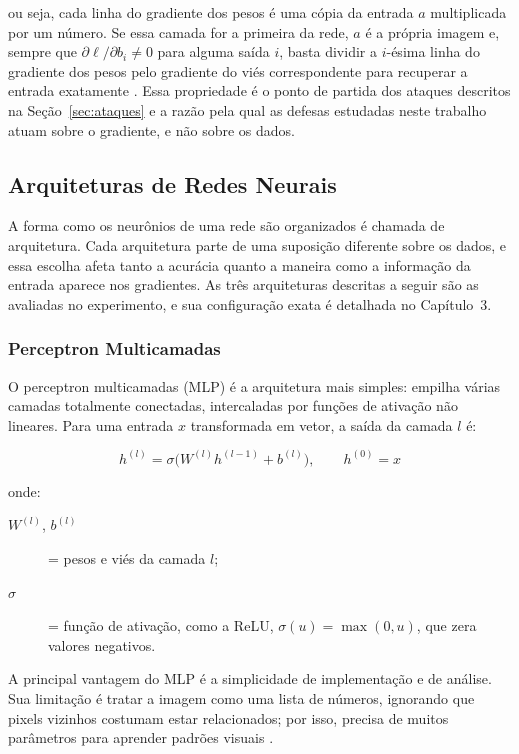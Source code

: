 \noindent ou seja, cada linha do gradiente dos pesos é uma cópia da entrada $a$ multiplicada por um número. Se essa camada for a primeira da rede, $a$ é a própria imagem e, sempre que $\partial \ell / \partial b_i \neq 0$ para alguma saída $i$, basta dividir a $i$-ésima linha do gradiente dos pesos pelo gradiente do viés correspondente para recuperar a entrada exatamente \cite{Geiping2020,Phong2018}. Essa propriedade é o ponto de partida dos ataques descritos na Seção~\ref{sec:ataques} e a razão pela qual as defesas estudadas neste trabalho atuam sobre o gradiente, e não sobre os dados.

\subsection{Arquiteturas de Redes Neurais}

A forma como os neurônios de uma rede são organizados é chamada de arquitetura. Cada arquitetura parte de uma suposição diferente sobre os dados, e essa escolha afeta tanto a acurácia quanto a maneira como a informação da entrada aparece nos gradientes. As três arquiteturas descritas a seguir são as avaliadas no experimento, e sua configuração exata é detalhada no Capítulo~3.

\subsubsection{Perceptron Multicamadas}

O perceptron multicamadas (MLP) é a arquitetura mais simples: empilha várias camadas totalmente conectadas, intercaladas por funções de ativação não lineares. Para uma entrada $x$ transformada em vetor, a saída da camada $l$ é:

\begin{equation} \label{eq:mlp}
h^{(l)} = \sigma\big(W^{(l)} h^{(l-1)} + b^{(l)}\big), \qquad h^{(0)} = x
\end{equation}

\noindent onde:
\begin{description}
  \item[$W^{(l)}$, $b^{(l)}$] = pesos e viés da camada $l$;
  \item[$\sigma$] = função de ativação, como a ReLU, $\sigma(u) = \max(0, u)$, que zera valores negativos.
\end{description}

A principal vantagem do MLP é a simplicidade de implementação e de análise. Sua limitação é tratar a imagem como uma lista de números, ignorando que pixels vizinhos costumam estar relacionados; por isso, precisa de muitos parâmetros para aprender padrões visuais \cite{Goodfellow2016}.

